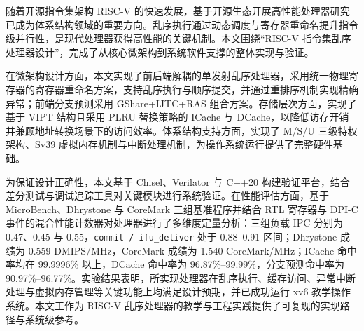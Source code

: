 

\begin{cabstract}

随着开源指令集架构 RISC-V 的快速发展，基于开源生态开展高性能处理器研究已成为体系结构领域的重要方向。乱序执行通过动态调度与寄存器重命名提升指令级并行性，是现代处理器获得高性能的关键机制。本文围绕“RISC-V 指令集乱序处理器设计”，完成了从核心微架构到系统软件支撑的整体实现与验证。

在微架构设计方面，本文实现了前后端解耦的单发射乱序处理器，采用统一物理寄存器的寄存器重命名方案，支持乱序执行与顺序提交，并通过重排序机制实现精确异常；前端分支预测采用 GShare+IJTC+RAS 组合方案。存储层次方面，实现了基于 VIPT 结构且采用 PLRU 替换策略的 ICache 与 DCache，以降低访存开销并兼顾地址转换场景下的访问效率。体系结构支持方面，实现了 M/S/U 三级特权架构、Sv39 虚拟内存机制与中断处理机制，为操作系统运行提供了完整硬件基础。

为保证设计正确性，本文基于 Chisel、Verilator 与 C++20 构建验证平台，结合差分测试与调试追踪工具对关键模块进行系统验证。在性能评估方面，基于 MicroBench、Dhrystone 与 CoreMark 三组基准程序并结合 RTL 寄存器与 DPI-C 事件的混合性能计数器对处理器进行了多维度定量分析：三组负载 IPC 分别为 0.47、0.45 与 0.55，\lstinline|commit / ifu_deliver| 处于 0.88--0.91 区间；Dhrystone 成绩为 0.559 DMIPS/MHz，CoreMark 成绩为 1.540 CoreMark/MHz；ICache 命中率均在 99.9996\% 以上，DCache 命中率为 96.87\%--99.99\%，分支预测命中率为 90.97\%--96.77\%。实验结果表明，所实现处理器在乱序执行、缓存访问、异常中断处理与虚拟内存管理等关键功能上均满足设计预期，并已成功运行 xv6 教学操作系统。本文工作为 RISC-V 乱序处理器的教学与工程实践提供了可复现的实现路径与系统级参考。

\end{cabstract}

